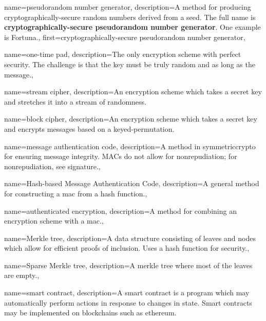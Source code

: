 {
    name={pseudorandom number generator},
    description={A method for producing cryptographically-secure
        random numbers derived from a seed.
        The full name is
        \textbf{cryptographically-secure pseudorandom number generator}.
        One example is Fortuna.},
    first={cryptographically-secure pseudorandom number generator},
}

{
    name={one-time pad},
    description={The only \gls{encryption scheme} with \gls{perfect security}.
        The challenge is that the key must be truly random
        and as long as the message.},
}

{
    name={stream cipher},
    description={An \gls{encryption scheme} which takes a secret key
        and stretches it into a stream of randomness.}
}

{
    name={block cipher},
    description={An \gls{encryption scheme} which takes a secret key
        and encrypts messages based on a keyed-\gls{permutation}.}
}

{
    name={message authentication code},
    description={A method in \gls{symmetriccrypto} for ensuring
        message integrity.
        MACs do not allow for nonrepudiation;
        for nonrepudiation, see \gls{signature}.},
}

{
    name={Hash-based Message Authentication Code},
    description={A general method for constructing
        a \gls{mac} from a \gls{hash function}.},
}

{
    name={authenticated encryption},
    description={A method for combining an \gls{encryption scheme} with
        a \gls{mac}.},
}

{
    name={Merkle tree},
    description={A data structure consisting of leaves and nodes
        which allow for efficient proofs of inclusion.
        Uses a \gls{hash function} for security.},
}

{
    name={Sparse Merkle tree},
    description={A \gls{merkle tree} where most of the leaves
        are empty.},
}

{
    name={smart contract},
    description={A smart contract is a program which may automatically
        perform actions in response to changes in state.
        Smart contracts may be implemented on blockchains such as
        \gls{ethereum}.}
}

